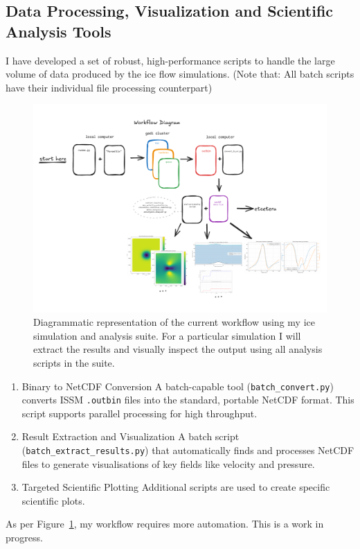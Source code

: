 \subsection{Data Processing, Visualization and Scientific Analysis Tools}\label{analysis_tools}
I have developed a set of robust, high-performance scripts to handle the large volume of data produced by the ice flow simulations. (Note that: All batch scripts have their individual file processing counterpart)
\begin{figure}[H]
    \includegraphics[scale=0.58]{figures/workflow_diagram.pdf}
    \caption{Diagrammatic representation of the current workflow using my ice simulation and analysis suite. For a particular simulation I will extract the results and visually inspect the output using  all analysis scripts in the suite.}\label{fig:workflow}
\end{figure}
\begin{enumerate}
\item{Binary to NetCDF Conversion} A batch-capable tool (\texttt{batch\_convert.py}) converts ISSM \texttt{.outbin} files into the standard, portable NetCDF format. This script supports parallel processing for high throughput.
\item{Result Extraction and Visualization} A batch script (\texttt{batch\_extract\_results.py}) that automatically finds and processes NetCDF files to generate visualisations of key fields like velocity and pressure. 
\item{Targeted Scientific Plotting} Additional scripts are used to create specific scientific plots.
\end{enumerate}
As per Figure~\ref{fig:workflow}, my workflow requires more automation. This is  a work in progress.
